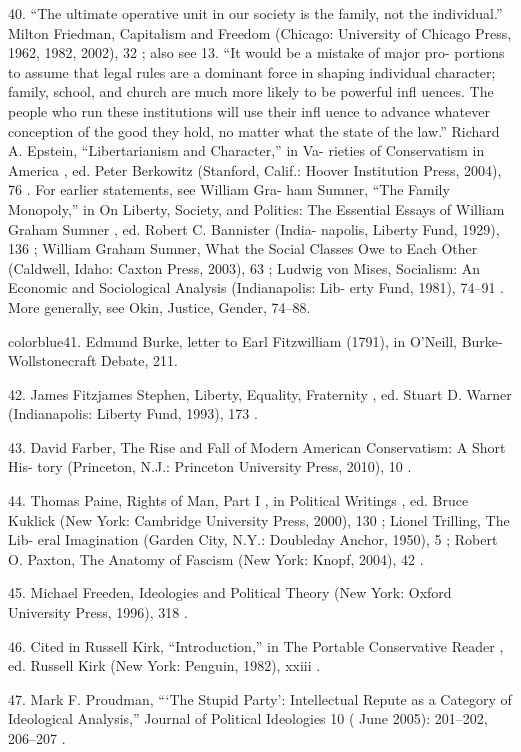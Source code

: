	{\color{blue}40}. “The ultimate operative unit in our society is the family, not the individual.” Milton Friedman, Capitalism and Freedom (Chicago: University of Chicago Press, 1962, 1982, 2002), 32 ; also see 13. “It would be a mistake of major pro- portions to assume that legal rules are a dominant force in shaping individual character; family, school, and church are much more likely to be powerful infl uences. The people who run these institutions will use their infl uence to advance whatever conception of the good they hold, no matter what the state of the law.” Richard A. Epstein, “Libertarianism and Character,” in Va- rieties of Conservatism in America , ed. Peter Berkowitz (Stanford, Calif.: Hoover Institution Press, 2004), 76 . For earlier statements, see William Gra- ham Sumner, “The Family Monopoly,” in On Liberty, Society, and Politics: The Essential Essays of William Graham Sumner , ed. Robert C. Bannister (India- napolis, Liberty Fund, 1929), 136 ; William Graham Sumner, What the Social Classes Owe to Each Other (Caldwell, Idaho: Caxton Press, 2003), 63 ; Ludwig von Mises, Socialism: An Economic and Sociological Analysis (Indianapolis: Lib- erty Fund, 1981), 74–91 . More generally, see Okin, Justice, Gender, 74–88.


	{color{blue}41}. Edmund Burke, letter to Earl Fitzwilliam (1791), in O’Neill, Burke- Wollstonecraft Debate, 211.


	{\color{blue}42}. James Fitzjames Stephen, Liberty, Equality, Fraternity , ed. Stuart D. Warner (Indianapolis: Liberty Fund, 1993), 173 .


	{\color{blue}43}. David Farber, The Rise and Fall of Modern American Conservatism: A Short His- tory (Princeton, N.J.: Princeton University Press, 2010), 10 .


	{\color{blue}44}. Thomas Paine, Rights of Man, Part I , in Political Writings , ed. Bruce Kuklick (New York: Cambridge University Press, 2000), 130 ; Lionel Trilling, The Lib- eral Imagination (Garden City, N.Y.: Doubleday Anchor, 1950), 5 ; Robert O. Paxton, The Anatomy of Fascism (New York: Knopf, 2004), 42 .


	{\color{blue}45}. Michael Freeden, Ideologies and Political Theory (New York: Oxford University Press, 1996), 318 .


	{\color{blue}46}. Cited in Russell Kirk, “Introduction,” in The Portable Conservative Reader , ed. Russell Kirk (New York: Penguin, 1982), xxiii .


	{\color{blue}47}. Mark F. Proudman, “‘The Stupid Party’: Intellectual Repute as a Category of Ideological Analysis,” Journal of Political Ideologies 10 ( June 2005): 201–202, 206–207 .


